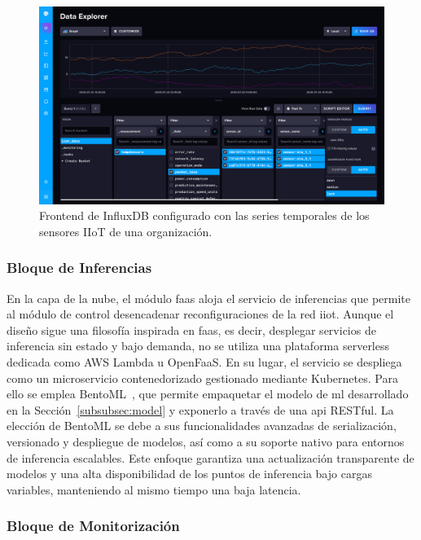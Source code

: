 \begin{figure}[ht!]
    \centering
    \includegraphics[width=\textwidth]{fig/08_datadriven/datadriven_07.pdf}
    \caption{Frontend de InfluxDB configurado con las series temporales de los sensores IIoT de una organización.}
    \label{fig:timeseries_influxdb}
\end{figure}


\subsubsection{Bloque de Inferencias}

En la capa de la nube, el módulo \gls{faas} aloja el servicio de inferencias que permite al módulo de control desencadenar reconfiguraciones de la red \gls{iiot}. Aunque el diseño sigue una filosofía inspirada en \gls{faas}, es decir, desplegar servicios de inferencia sin estado y bajo demanda, no se utiliza una plataforma serverless dedicada como AWS Lambda u OpenFaaS. En su lugar, el servicio se despliega como un microservicio contenedorizado gestionado mediante Kubernetes. Para ello se emplea BentoML~\cite{bentoml}, que permite empaquetar el modelo de \gls{ml} desarrollado en la Sección~\ref{subsubsec:model} y exponerlo a través de una \gls{api} RESTful. La elección de BentoML se debe a sus funcionalidades avanzadas de serialización, versionado y despliegue de modelos, así como a su soporte nativo para entornos de inferencia escalables. Este enfoque garantiza una actualización transparente de modelos y una alta disponibilidad de los puntos de inferencia bajo cargas variables, manteniendo al mismo tiempo una baja latencia.



\subsubsection{Bloque de Monitorización}

